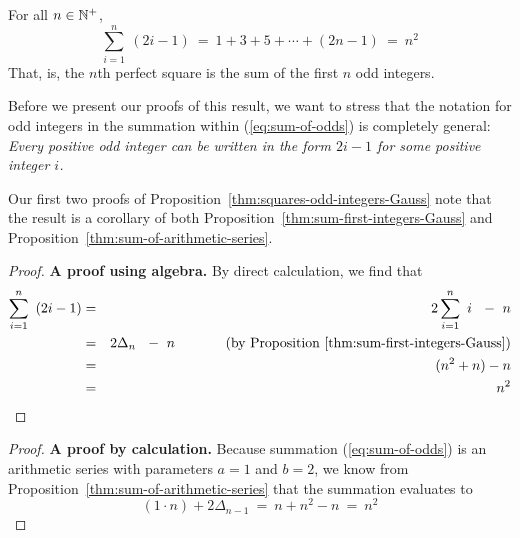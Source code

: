\begin{prop}
\label{thm:squares-odd-integers-Gauss}
For all $n \in \mathbb{N}^+$,
\begin{equation}
\label{eq:sum-of-odds}
\sum_{i=1}^n \ (2i-1)
 \ = \ 1 + 3 + 5 + \cdots + (2n-1) \ = \ n^2
\end{equation}
That, is, the $n$th perfect square is the sum of the first $n$ odd integers.
\end{prop}

Before we present our proofs of this result, we want to stress that the notation for odd integers in the summation within (\ref{eq:sum-of-odds}) is completely general: {\em Every positive odd integer can be written in the form $2i-1$ for some positive integer $i$.}

\bigskip

Our first two proofs of Proposition~\ref{thm:squares-odd-integers-Gauss} note that the result is a corollary of both Proposition~\ref{thm:sum-first-integers-Gauss} and Proposition~\ref{thm:sum-of-arithmetic-series}.

\medskip

\begin{proof}
{\bf A proof using algebra.}
By direct calculation, we find that
\begin{eqnarray*}
\sum_{i=1}^n \ \left( 2i-1 \right)
   & = & 2 \sum_{i=1}^n \ i \ \ - \ n \\
   & = & 2 \Delta_n \ \ - \ n \ \ \ \ \ \ \ \ \ \ \mbox{ (by
  Proposition~\ref{thm:sum-first-integers-Gauss})} \\
   & = & (n^2 + n) - n \\
   & = & n^2
\end{eqnarray*}
\end{proof}

\medskip

\begin{proof}
{\bf A proof by calculation.}
%
Because summation (\ref{eq:sum-of-odds}) is an arithmetic series with parameters $a=1$ and $b=2$, we know from Proposition~\ref{thm:sum-of-arithmetic-series} that the summation evaluates to
\[ (1 \cdot n) + 2 \Delta_{n-1} \ = \ n + n^2 -n \ = \ n^2 \]
\end{proof}


